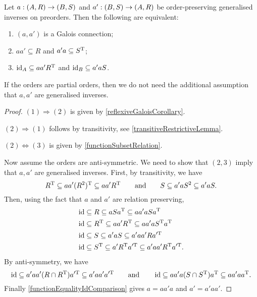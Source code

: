 \begin{proposition} \label{preorderGaloisCondition}
Let $a: \left( A,R \right) \to \left( B,S \right)$ and $a': \left( B,S \right) \to \left( A,R \right)$ be order-preserving generalised inverses on preorders. Then the following are equivalent:
\begin{enumerate}
\item $(a, a')$ is a Galois connection;
\item $aa' \subseteq R$ and $a'a \subseteq S^{\mathrm{T}}$;
\item $\operatorname{id}_A \subseteq aa'R^{\mathrm{T}}$ and $\operatorname{id}_B \subseteq a'aS$.
\end{enumerate}
If the orders are partial orders, then we do not need the additional assumption that $a, a'$ are generalised inverses.
\end{proposition}
\begin{proof}
$(1) \Rightarrow (2)$ is given by \ref{reflexiveGaloisCorollary}.

$(2) \Rightarrow (1)$ follows by transitivity, see \ref{transitiveRestrictiveLemma}.

$(2) \Leftrightarrow (3)$ is given by \ref{functionSubsetRelation}.

Now assume the orders are anti-symmetric. We need to show that $(2,3)$ imply that $a, a'$ are generalised inverses. First, by transitivity, we have
\[ R^{\mathrm{T}} \subseteq aa'(R^2)^{\mathrm{T}} \subseteq aa'R^{\mathrm{T}} \qquad\text{and}\qquad S \subseteq a'aS^2 \subseteq a'aS. \]
Then, using the fact that $a$ and $a'$ are relation preserving,
\begin{align*}
\operatorname{id} &\subseteq R \subseteq aSa^{\mathrm{T}} \subseteq aa'aSa^{\mathrm{T}} \\
\operatorname{id} &\subseteq R^{\mathrm{T}} \subseteq aa'R^{\mathrm{T}} \subseteq aa'aS^{\mathrm{T}} a^{\mathrm{T}} \\
\operatorname{id} &\subseteq S \subseteq a'aS \subseteq a'aa'Ra^{\prime\mathrm{T}} \\
\operatorname{id} &\subseteq S^{\mathrm{T}} \subseteq a'R^{\mathrm{T}} a^{\prime\mathrm{T}} \subseteq a'aa'R^{\mathrm{T}} a^{\prime\mathrm{T}}.
\end{align*}
By anti-symmetry, we have
\[ \operatorname{id} \subseteq a'aa'(R\cap R^{\mathrm{T}})a^{\prime\mathrm{T}} \subseteq a'aa'a^{\prime\mathrm{T}} \qquad\text{and}\qquad \operatorname{id} \subseteq  aa'a(S\cap S^{\mathrm{T}})a^{\mathrm{T}} \subseteq aa'aa^{\mathrm{T}}. \]
Finally \ref{functionEqualityIdComparison} gives $a = aa'a$ and $a' = a'aa'$.
\end{proof}

